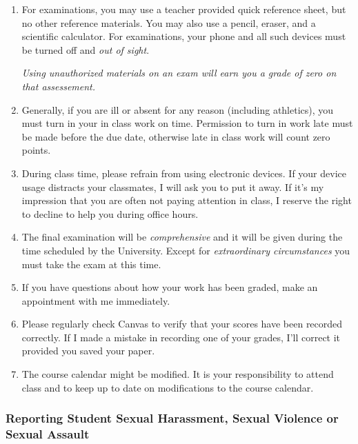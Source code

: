 \documentclass[12pt]{article}
\newcounter{on}\setcounter{on}{0}
\newcounter{ex}\setcounter{ex}{0}
\begin{document}
\begin{enumerate}
\item For examinations, you may use a teacher provided quick reference sheet, 
but no other reference materials. You may also use a pencil, eraser, 
and a scientific calculator. For examinations, your phone and all such
devices must be turned off and \emph{out of sight}. 

\emph{Using unauthorized materials on an exam will earn you a grade of zero on that assessement.}

\item Generally, if you are ill or absent for any reason (including 
athletics), you must turn in your in class work on time. Permission to
turn in work late must be made before the due date, otherwise late in class work 
will count zero points.

\item During class time, please refrain from using electronic devices. If your 
device usage distracts your classmates, I will ask you to put it away. If it's my 
impression that you are often not paying attention in class, I reserve the right to 
decline to help you during office hours.

\item The final examination will be \emph{comprehensive} and it will be given 
during the  time scheduled by the University. Except for \emph{extraordinary circumstances}
you must take the exam at this time.
 
\item If you have questions about how your work has been graded, make an appointment with me immediately.

\item Please regularly check Canvas  to verify that your scores have 
been recorded correctly.  If I made a mistake in recording one of
your grades, I'll correct it provided you saved your paper.

\item The course calendar might be modified. It is your responsibility to attend
class and to keep up to date on modifications to the course calendar.

\end{enumerate}


\subsubsection*{Reporting Student Sexual Harassment, Sexual Violence or Sexual Assault}
\end{document}
